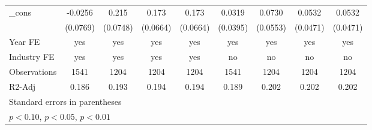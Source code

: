 \begin{table}[htbp]
\begin{tabular}{l*{8}{c}}
\_cons              &     -0.0256         &       0.215\sym{***}&       0.173\sym{**} &       0.173\sym{**} &      0.0319         &      0.0730         &      0.0532         &      0.0532         \\
                    &    (0.0769)         &    (0.0748)         &    (0.0664)         &    (0.0664)         &    (0.0395)         &    (0.0553)         &    (0.0471)         &    (0.0471)         \\
\hline
Year FE             &         yes         &         yes         &         yes         &         yes         &         yes         &         yes         &         yes         &         yes         \\
Industry FE         &         yes         &         yes         &         yes         &         yes         &          no         &          no         &          no         &          no         \\
Observations        &        1541         &        1204         &        1204         &        1204         &        1541         &        1204         &        1204         &        1204         \\
R2-Adj              &       0.186         &       0.193         &       0.194         &       0.194         &       0.189         &       0.202         &       0.202         &       0.202         \\
\hline\hline
\multicolumn{9}{l}{\footnotesize Standard errors in parentheses}\\
\multicolumn{9}{l}{\footnotesize \sym{*} \(p<0.10\), \sym{**} \(p<0.05\), \sym{***} \(p<0.01\)}\\
\end{tabular}
\end{table}
